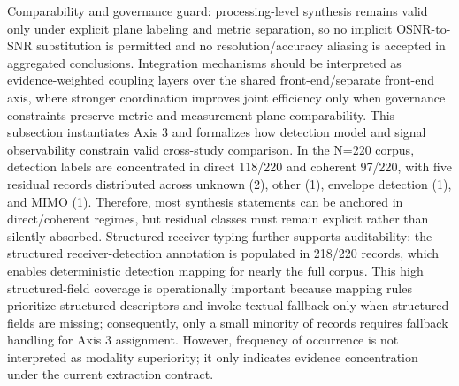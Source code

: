 {}Comparability and governance guard: processing-level synthesis remains valid only under explicit plane labeling and metric separation, so no implicit OSNR-to-SNR substitution is permitted and no resolution/accuracy aliasing is accepted in aggregated conclusions.\markdownRendererParagraphSeparator
{} Integration mechanisms should be interpreted as evidence-weighted coupling layers over the shared front-end/separate front-end axis, where stronger coordination improves joint efficiency only when governance constraints preserve metric and measurement-plane comparability.\markdownRendererInterblockSeparator
{}\markdownRendererThematicBreak{}\markdownRendererInterblockSeparator
{}
\markdownRendererSectionEnd 
\markdownRendererSectionEnd \markdownRendererSectionBegin
{}\markdownRendererInterblockSeparator
{}This subsection instantiates Axis 3 and formalizes how detection model and signal observability constrain valid cross-study comparison. In the N=220 corpus, detection labels are concentrated in direct 118/220 and coherent 97/220, with five residual records distributed across unknown (2), other (1), envelope detection (1), and MIMO (1). Therefore, most synthesis statements can be anchored in direct/coherent regimes, but residual classes must remain explicit rather than silently absorbed. Structured receiver typing further supports auditability: the structured receiver-detection annotation is populated in 218/220 records, which enables deterministic detection mapping for nearly the full corpus. This high structured-field coverage is operationally important because mapping rules prioritize structured descriptors and invoke textual fallback only when structured fields are missing; consequently, only a small minority of records requires fallback handling for Axis 3 assignment. However, frequency of occurrence is not interpreted as modality superiority; it only indicates evidence concentration under the current extraction contract.\markdownRendererParagraphSeparator
{}\markdownRendererInterblockSeparator
